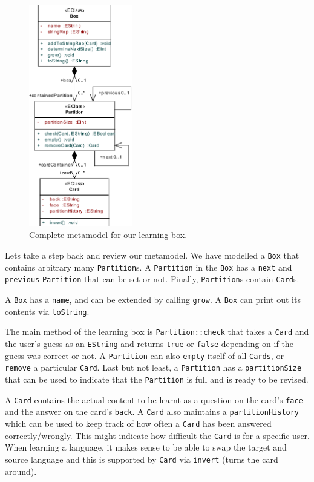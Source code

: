 \begin{figure}[htbp]
	\centering
  \includegraphics[width=0.4\textwidth]{pics/memBoxBilder/memBox44}
	\caption{Complete metamodel for our learning box.}
	\label{fig:metamodel_complete}
\end{figure}

Lets take a step back and review our metamodel.
We have modelled a \texttt{Box} that contains arbitrary many \texttt{Partition}s.
A \texttt{Partition} in the \texttt{Box} has a \texttt{next} and \texttt{previous} \texttt{Partition} that can be set or not. Finally, \texttt{Partition}s contain \texttt{Card}s.

A \texttt{Box} has a \texttt{name}, and can be extended by calling \texttt{grow}.
A \texttt{Box} can print out its contents via \texttt{toString}.

The main method of the learning box is \texttt{Partition::check} that takes a \texttt{Card} and the user's guess as an \texttt{EString} and returns \texttt{true} or \texttt{false} depending on if the guess was correct or not.
A \texttt{Partition} can also \texttt{empty} itself of all \texttt{Cards}, or \texttt{remove} a particular \texttt{Card}.
Last but not least, a \texttt{Partition} has a \texttt{partitionSize} that can be used to indicate that the \texttt{Partition} is full and is ready to be revised.

A \texttt{Card} contains the actual content to be learnt as a question on the card's \texttt{face} and the answer on the card's \texttt{back}.
A \texttt{Card} also maintains a \texttt{partition\-History} which can be used to keep track of how often a \texttt{Card} has been answered correctly/wrongly.
This might indicate how difficult the \texttt{Card} is for a specific user.
When learning a language, it makes sense to be able to swap the target and source language and this is supported by \texttt{Card} via \texttt{invert} (turns the card around).


